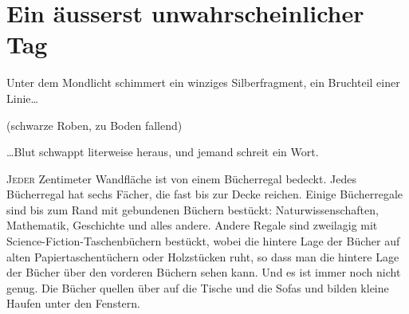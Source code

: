 \chapter[Ein äußerst unwahrscheinlicher Tag]{Ein äusserst unwahrscheinlicher Tag}

\begin{chapterOpeningQuote}
\noindent
Unter dem Mondlicht schimmert ein winziges Silberfragment, ein Bruchteil einer Linie…

\vspace*{2ex}
(schwarze Roben, zu Boden fallend)

\vspace*{2ex}
…Blut schwappt literweise heraus, und jemand schreit ein Wort.
\end{chapterOpeningQuote}

\lettrine{J}{eder} Zentimeter Wandfläche ist von einem Bücherregal bedeckt. Jedes Bücherregal hat sechs Fächer, die fast bis zur Decke reichen. Einige Bücherregale sind bis zum Rand mit gebundenen Büchern bestückt: Naturwissenschaften, Mathematik, Geschichte und alles andere. Andere Regale sind zweilagig mit Science-Fiction-Taschenbüchern bestückt, wobei die hintere Lage der Bücher auf alten Papiertaschentüchern oder Holzstücken ruht, so dass man die hintere Lage der Bücher über den vorderen Büchern sehen kann. Und es ist immer noch nicht genug. Die Bücher quellen über auf die Tische und die Sofas und bilden kleine Haufen unter den Fenstern.

